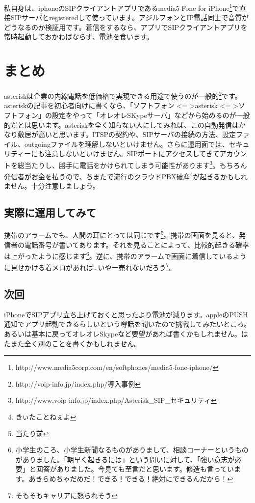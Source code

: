 私自身は、iphoneのSIPクライアントアプリであるmedia5-Fone for iPhone\footnote{http://www.media5corp.com/en/softphones/media5-fone-iphone/}で直接SIPサーバとregisteredして使っています。アジルフォンとIP電話同士で音質がどうなるのか検証用です。着信をするなら、アプリでSIPクライアントアプリを常時起動しておかねばならず、電池を食います。

\section{まとめ}
asteriskは企業の内線電話を低価格で実現できる用途で使うのが一般的\footnote{http://voip-info.jp/index.php/導入事例}です。asteriskの記事を初心者向けに書くなら、「ソフトフォン \textless = \textgreater asterisk \textless = \textgreater ソフトフォン」の設定をやって「オレオレSKypeサーバ」などから始めるのが一般的だとは思います。asteriskを全く知らない人にしてみれば、この自動発信はかなり敷居が高いと思います。ITSPの契約や、SIPサーバの接続の方法、設定ファイル、outgoingファイルを理解しないといけません。さらに運用面では、セキュリティーにも注意しないといけません。SIPポートにアクセスしてきてアカウントを総当たりし、勝手に電話をかけられてしまう可能性があります\footnote{http://www.voip-info.jp/index.php/Asterisk\_SIP\_セキュリティ}。もちろん発信者がお金を払うので、ちまたで流行のクラウドPBX破産\footnote{きぃたことねぇよ}が起きるかもしれません。十分注意しましょう。

\subsection{実際に運用してみて}
携帯のアラームでも、人間の耳にとっては同じです\footnote{当たり前}。携帯の画面を見ると、発信者の電話番号が書いてあります。それを見ることによって、比較的起きる確率は上がったように感じます\footnote{小学生のころ、小学生新聞なるものがありまして、相談コーナーというものがありました。「朝早く起きるには」という問いに対して、「強い意志が必要」と回答がありました。今見ても至言だと思います。修造も言っています。あきらめちゃだめだ！できる！できる！絶対にできるんだから！}。逆に、携帯のアラームで画面に着信しているように見せかける着メロがあれば…いやー売れないだろう\footnote{そもそもキャリアに怒られそう}。

\subsection{次回}
iPhoneでSIPアプリ立ち上げておくと思ったより電池が減ります。appleのPUSH通知でアプリ起動できるらしいという噂話を聞いたので挑戦してみたいところ。あるいは基本に戻ってオレオレSkypeなど要望があれば書くかもしれません。はたまた全く別のことを書くかもしれません。

